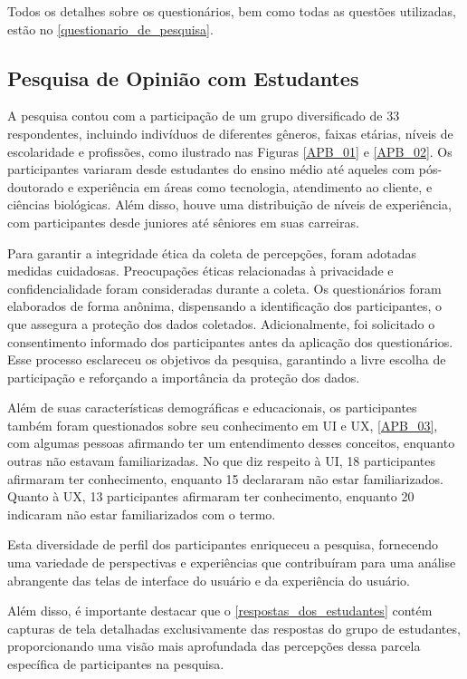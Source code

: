 Todos os detalhes sobre os questionários, bem como todas as questões utilizadas, estão no \autoref{questionario_de_pesquisa}.

\subsection{Pesquisa de Opinião com Estudantes}
\label{Pesquisa_de_Opinião_com_Estudantes}

A pesquisa contou com a participação de um grupo diversificado de 33 respondentes, incluindo indivíduos de diferentes gêneros, faixas etárias, níveis de escolaridade e profissões, como ilustrado nas Figuras \ref{APB_01} e \ref{APB_02}. Os participantes variaram desde estudantes do ensino médio até aqueles com pós-doutorado e experiência em áreas como tecnologia, atendimento ao cliente, e ciências biológicas. Além disso, houve uma distribuição de níveis de experiência, com participantes desde juniores até sêniores em suas carreiras.

Para garantir a integridade ética da coleta de percepções, foram adotadas medidas cuidadosas. Preocupações éticas relacionadas à privacidade e confidencialidade foram consideradas durante a coleta. Os questionários foram elaborados de forma anônima, dispensando a identificação dos participantes, o que assegura a proteção dos dados coletados. Adicionalmente, foi solicitado o consentimento informado dos participantes antes da aplicação dos questionários. Esse processo esclareceu os objetivos da pesquisa, garantindo a livre escolha de participação e reforçando a importância da proteção dos dados.

Além de suas características demográficas e educacionais, os participantes também foram questionados sobre seu conhecimento em \ac{UI} e \ac{UX}, \autoref{APB_03}, com algumas pessoas afirmando ter um entendimento desses conceitos, enquanto outras não estavam familiarizadas. No que diz respeito à \ac{UI}, 18 participantes afirmaram ter conhecimento, enquanto 15 declararam não estar familiarizados. Quanto à \ac{UX}, 13 participantes afirmaram ter conhecimento, enquanto 20 indicaram não estar familiarizados com o termo.

Esta diversidade de perfil dos participantes enriqueceu a pesquisa, fornecendo uma variedade de perspectivas e experiências que contribuíram para uma análise abrangente das telas de interface do usuário e da experiência do usuário. 

Além disso, é importante destacar que o \autoref{respostas_dos_estudantes} contém capturas de tela detalhadas exclusivamente das respostas do grupo de estudantes, proporcionando uma visão mais aprofundada das percepções dessa parcela específica de participantes na pesquisa.

